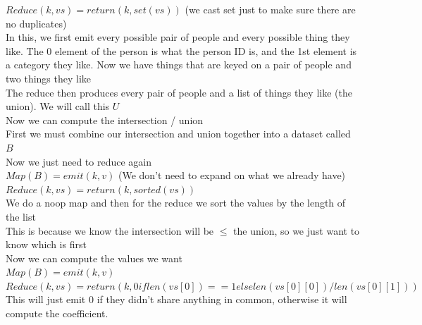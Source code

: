 \documentclass[11pt]{article}
\theoremstyle{definition}
\begin{document}
$Reduce(k, vs) = return (k, set(vs))$ (we cast set just to make sure there are no duplicates)\\
In this, we first emit every possible pair of people and every possible thing they like.  The 0 element of the person is what the person ID is, and the 1st element is a category they like.  Now we have things that are keyed on a pair of people and two things they like\\
The reduce then produces every pair of people and a list of things they like (the union).  We will call this $U$\\
\newline
Now we can compute the intersection / union\\
First we must combine our intersection and union together into a dataset called $B$\\
Now we just need to reduce again\\
$Map(B) = emit(k, v)$ (We don't need to expand on what we already have)\\
$Reduce(k, vs) = return(k, sorted(vs))$\\
We do a noop map and then for the reduce we sort the values by the length of the list\\
This is because we know the intersection will be $\le$ the union, so we just want to know which is first\\
Now we can compute the values we want\\
$Map(B) = emit(k, v)$\\
$Reduce(k, vs) = return(k, 0 if len(vs[0]) == 1 else  len(vs[0][0]) / len(vs[0][1]))$\\
This will just emit 0 if they didn't share anything in common, otherwise it will compute the coefficient.
\end{document}
